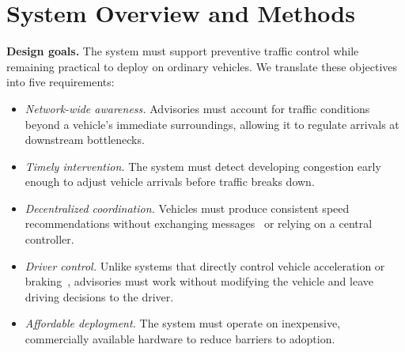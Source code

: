 \documentclass[letterpaper, 10pt, journal, twoside]{IEEEtran}
\begin{document}
\section{System Overview and Methods}

\label{sec:method}

\noindent\textbf{Design goals.} The system must support preventive traffic control while remaining practical to deploy on ordinary vehicles. We translate these objectives into five requirements:

\begin{itemize}[wide=0pt,itemsep=1pt,topsep=2pt]

\item[(G1)] \emph{Network-wide awareness.} Advisories must account for traffic conditions beyond a vehicle's immediate surroundings, allowing it to regulate arrivals at downstream bottlenecks.

\item[(G2)] \emph{Timely intervention.} The system must detect developing congestion early enough to adjust vehicle arrivals before traffic breaks down.

\item[(G3)] \emph{Decentralized coordination.} Vehicles must produce consistent speed recommendations without exchanging messages~\cite{kenney2011dedicated,sae2020j2735} or relying on a central controller.

\item[(G4)] \emph{Driver control.} Unlike systems that directly control vehicle acceleration or braking~\cite{lee2024traffic}, advisories must work without modifying the vehicle and leave driving decisions to the driver.

\item[(G5)] \emph{Affordable deployment.} The system must operate on inexpensive, commercially available hardware to reduce barriers to adoption.
\end{itemize}
\end{document}
